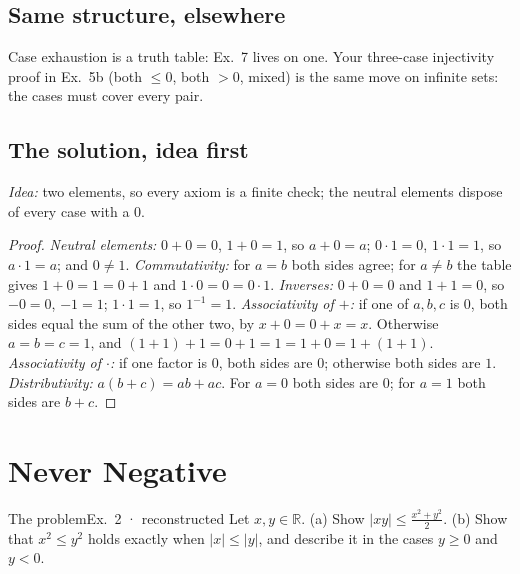 \documentclass{kaelearn}
\begin{document}
\subsection{Same structure, elsewhere}
Case exhaustion is a truth table: Ex.\ 7 lives on one. Your three-case injectivity proof in Ex.\ 5b (both $\le0$,
both $>0$, mixed) is the same move on infinite sets: the cases must cover every pair.



\subsection{The solution, idea first}
\emph{Idea:} two elements, so every axiom is a finite check; the neutral elements dispose of every case with a $0$.
\begin{proof}
\emph{Neutral elements:} $0+0=0$, $1+0=1$, so $a+0=a$; $0\cdot1=0$, $1\cdot1=1$, so $a\cdot1=a$; and $0\neq1$.
\emph{Commutativity:} for $a=b$ both sides agree; for $a\neq b$ the table gives $1+0=1=0+1$ and $1\cdot0=0=0\cdot1$.
\emph{Inverses:} $0+0=0$ and $1+1=0$, so $-0=0$, $-1=1$; $1\cdot1=1$, so $1^{-1}=1$.
\emph{Associativity of $+$:} if one of $a,b,c$ is $0$, both sides equal the sum of the other two, by $x+0=0+x=x$.
Otherwise $a=b=c=1$, and $(1+1)+1=0+1=1=1+0=1+(1+1)$.
\emph{Associativity of $\cdot$:} if one factor is $0$, both sides are $0$; otherwise both sides are $1$.
\emph{Distributivity:} $a(b+c)=ab+ac$. For $a=0$ both sides are $0$; for $a=1$ both sides are $b+c$.
\end{proof}

\section{Never Negative}

\begin{panel}[unbreakable]{The problem}{Ex.\ 2 · reconstructed}{}
Let $x,y\in\mathbb{R}$. (a) Show $|xy|\le\frac{x^2+y^2}{2}$. (b) Show that $x^2\le y^2$ holds exactly when
$|x|\le|y|$, and describe it in the cases $y\ge0$ and $y<0$.
\end{panel}
\end{document}

